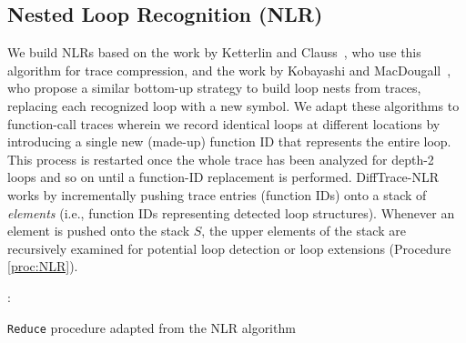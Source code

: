 \subsection{Nested Loop Recognition (NLR)}
\label{subsec:algo-nlr}

We build NLRs based on the work by Ketterlin and Clauss~\cite{Ketterlin-nlr},
who use this algorithm for trace compression,
and the work by Kobayashi and MacDougall~\cite{kobayashi-84}, who propose
a similar bottom-up strategy to build loop nests from traces,
replacing each recognized loop with a new symbol.
%
%
%
%
We adapt these algorithms
to function-call traces
wherein we record
identical loops at different locations by introducing
a single new (made-up) function ID that represents the entire loop.
%
This process is restarted once the whole trace has been analyzed for depth-2 loops and so on until a function-ID replacement is performed.
%
DiffTrace-NLR works by incrementally pushing trace entries (function IDs)
onto a stack of \textit{elements} (i.e., function IDs
representing detected loop structures).
%
Whenever an element is pushed onto the stack $S$,
the upper elements of the stack are recursively
examined for potential loop detection or loop extensions (Procedure \ref{proc:NLR}). 


\begin{small}
\begin{algorithm}[]
 \DontPrintSemicolon
 :{\\
 \Indp
 }

 \caption{\texttt{Reduce} procedure adapted from the NLR algorithm }
 \label{proc:NLR}
\end{algorithm}
\end{small}

